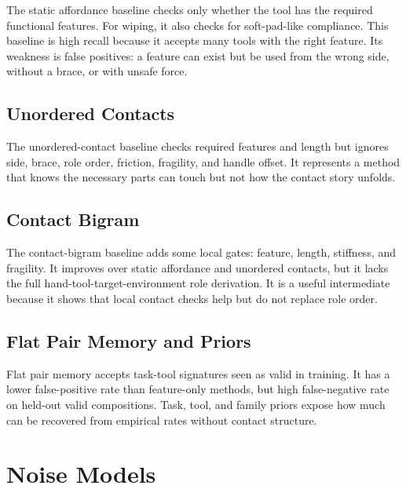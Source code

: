\documentclass{article}
\begin{document}
The static affordance baseline checks only whether the tool has the required functional features. For wiping, it also checks for soft-pad-like compliance. This baseline is high recall because it accepts many tools with the right feature. Its weakness is false positives: a feature can exist but be used from the wrong side, without a brace, or with unsafe force.

\subsection{Unordered Contacts}

The unordered-contact baseline checks required features and length but ignores side, brace, role order, friction, fragility, and handle offset. It represents a method that knows the necessary parts can touch but not how the contact story unfolds.

\subsection{Contact Bigram}

The contact-bigram baseline adds some local gates: feature, length, stiffness, and fragility. It improves over static affordance and unordered contacts, but it lacks the full hand-tool-target-environment role derivation. It is a useful intermediate because it shows that local contact checks help but do not replace role order.

\subsection{Flat Pair Memory and Priors}

Flat pair memory accepts task-tool signatures seen as valid in training. It has a lower false-positive rate than feature-only methods, but high false-negative rate on held-out valid compositions. Task, tool, and family priors expose how much can be recovered from empirical rates without contact structure.

\section{Noise Models}
\end{document}
